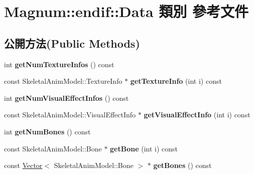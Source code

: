 \hypertarget{class_magnum_1_1endif_1_1_data}{}\section{Magnum\+:\+:endif\+:\+:Data 類別 參考文件}
\label{class_magnum_1_1endif_1_1_data}
\subsection*{公開方法(Public Methods)}
\begin{DoxyCompactItemize}
\item 
int {\bfseries get\+Num\+Texture\+Infos} () const \hypertarget{class_magnum_1_1endif_1_1_data_ae0bbe67a409e43119bc0ee9641ac4f30}{}\label{class_magnum_1_1endif_1_1_data_ae0bbe67a409e43119bc0ee9641ac4f30}

\item 
const Skeletal\+Anim\+Model\+::\+Texture\+Info $\ast$ {\bfseries get\+Texture\+Info} (int i) const \hypertarget{class_magnum_1_1endif_1_1_data_afacf4824348068a48cbbd6adb8000f50}{}\label{class_magnum_1_1endif_1_1_data_afacf4824348068a48cbbd6adb8000f50}

\item 
int {\bfseries get\+Num\+Visual\+Effect\+Infos} () const \hypertarget{class_magnum_1_1endif_1_1_data_a791457a094f7399b7515c8a1990ce45d}{}\label{class_magnum_1_1endif_1_1_data_a791457a094f7399b7515c8a1990ce45d}

\item 
const Skeletal\+Anim\+Model\+::\+Visual\+Effect\+Info $\ast$ {\bfseries get\+Visual\+Effect\+Info} (int i) const \hypertarget{class_magnum_1_1endif_1_1_data_a40bcefcae88cdb320c67b2d3f08df6d6}{}\label{class_magnum_1_1endif_1_1_data_a40bcefcae88cdb320c67b2d3f08df6d6}

\item 
int {\bfseries get\+Num\+Bones} () const \hypertarget{class_magnum_1_1endif_1_1_data_a7c2b88e6f69ced22ecad2ce264dfcd7b}{}\label{class_magnum_1_1endif_1_1_data_a7c2b88e6f69ced22ecad2ce264dfcd7b}

\item 
const Skeletal\+Anim\+Model\+::\+Bone $\ast$ {\bfseries get\+Bone} (int i) const \hypertarget{class_magnum_1_1endif_1_1_data_aa1abb3c89f9f0e075eb5be4bcae9913d}{}\label{class_magnum_1_1endif_1_1_data_aa1abb3c89f9f0e075eb5be4bcae9913d}

\item 
const \hyperlink{class_magnum_1_1_vector}{Vector}$<$ Skeletal\+Anim\+Model\+::\+Bone $>$ $\ast$ {\bfseries get\+Bones} () const \hypertarget{class_magnum_1_1endif_1_1_data_a9ca7fb7d9485de368af82658ff355d83}{}\label{class_magnum_1_1endif_1_1_data_a9ca7fb7d9485de368af82658ff355d83}


\end{DoxyCompactItemize}
